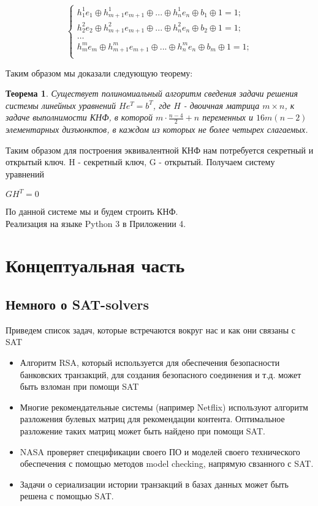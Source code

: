 \documentclass[12pt]{article}
\begin{document}
\[
\begin{cases}
h_{1}^{1}e_{1}\oplus h_{m+1}^{1}e_{m+1}\oplus ... \oplus h_{n}^{1}e_{n} \oplus b_{1}
\oplus 1 = 1;  \\
h_{2}^{2}e_{2}\oplus h_{m+1}^{2}e_{m+1}\oplus ... \oplus h_{n}^{2}e_{n} \oplus b_{2} \oplus 1 = 1;  \\
\dots \\
h_{m}^{m}e_{m}\oplus h_{m+1}^{m}e_{m+1}\oplus ... \oplus h_{n}^{m}e_{n} \oplus b_{m} \oplus 1 = 1;  \\
\end{cases}
\]


Таким образом мы доказали следующую теорему:

\newtheorem{Th}{Теорема}
\begin{Th}
Существует полиномиальный алгоритм сведения задачи решения системы линейных уравнений $He^{T} = b^{T}$, где $H$ - двоичная матрица $m\times n$, к задаче выполнимости КНФ, в которой $ m \cdot \frac{n-4}{2} + n$ переменных и $16m(n-2)$ элементарных дизъюнктов, в каждом из которых не более четырех слагаемых.
\end{Th}

Таким образом для построения эквивалентной КНФ нам потребуется секретный и открытый ключ. H - секретный ключ, G - открытый. Получаем систему уравнений 
\begin{center}
\textbf{$GH^{T} = 0$}
\end{center}



По данной системе мы и будем строить КНФ.
\\

Реализация на языке Python 3 в Приложении 4.
\newpage

\section{Концептуальная часть}

\subsection{Немного о SAT-solvers}

Приведем список задач, которые встречаются вокруг нас и как они связаны с SAT

\begin{itemize}
\item Алгоритм RSA, который используется для обеспечения безопасности банковских транзакций, для создания безопасного соединения и т.д. может быть взломан при помощи SAT	
\item Многие рекомендательные системы (например Netflix) используют алгоритм разложения булевых матриц для рекомендации контента. Оптимальное разложение таких матриц может быть найдено при помощи SAT.
\item NASA проверяет спецификации своего ПО и моделей своего технического обеспечения с помощью методов model checking, напрямую свзанного с SAT.
\item Задачи о сериализации истории транзакций в базах данных может быть решена с помощью SAT.
\end{itemize}
\end{document}
